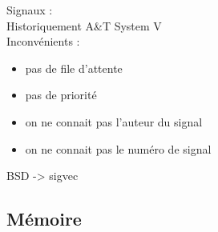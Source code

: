 \documentclass{article}
\begin{document}
Signaux :\\
Historiquement A\&T System V\\

Inconvénients : 
\begin{itemize}
	\item pas de file d'attente
	\item pas de priorité
	\item on ne connait pas l'auteur du signal
	\item on ne connait pas le numéro de signal
\end{itemize}

\vskip 1cm
BSD -> sigvec\\

\subsection{Mémoire}
\end{document}
